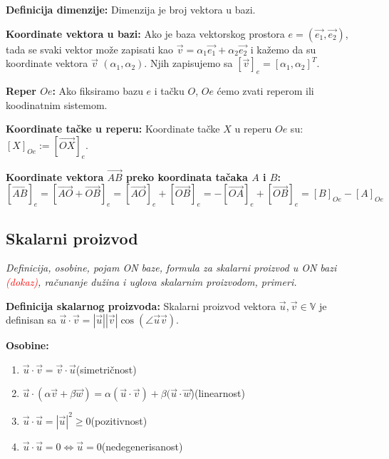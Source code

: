 \documentclass[12pt]{article}
\newcommand{\vek}[1]{\overrightarrow{#1}}
\newcommand{\ocena}[1]{\textcolor{red}{#1}}
\begin{document}
\textbf{Definicija dimenzije:} Dimenzija je broj vektora u bazi.
\par

\textbf{Koordinate vektora u bazi:} Ako je baza vektorskog prostora
$e=(\vek{e_1}, \vek{e_2})$, tada se svaki vektor može zapisati kao
$\vek{v}=\alpha_1\vek{e_1}+\alpha_2\vek{e_2}$ i kažemo da su koordinate
vektora $\vek{v}$ $(\alpha_1, \alpha_2)$. Njih zapisujemo sa
$[\vek{v}]_e=[\alpha_1, \alpha_2]^T$.
\par

\textbf{Reper $Oe$:} Ako fiksiramo bazu $e$ i tačku $O$, $Oe$ ćemo zvati reperom
ili koodinatnim sistemom.
\par

\textbf{Koordinate tačke u reperu:} Koordinate tačke $X$ u reperu $Oe$ su:
$[X]_{Oe}:=[\vek{OX}]_e$.
\par

\textbf{Koordinate vektora $\vek{AB}$ preko koordinata tačaka $A$ i $B$:}
$$[\vek{AB}]_e=[\vek{AO}+\vek{OB}]_e=[\vek{AO}]_e+[\vek{OB}]_e=
    -[\vek{OA}]_e+[\vek{OB}]_e=[B]_{Oe}-[A]_{Oe}$$


\subsection{Skalarni proizvod}
\textit{Definicija, osobine, pojam ON baze, formula za skalarni proizvod u ON
    bazi \ocena{(dokaz)}, računanje dužina i uglova skalarnim proizvodom, primeri.}
\par
\vspace*{1cm}

\textbf{Definicija skalarnog proizvoda:} Skalarni proizvod vektora
$\vek{u},\vek{v}\in\mathbb{V}$ je definisan sa $\vek{u}\cdot\vek{v}=|\vek{u}|
    |\vek{v}|\cos(\angle{\vek{u}\vek{v}})$.
\par

\textbf{Osobine:}
\begin{enumerate}[label=\textbf{(\arabic*)}]
    \item $\vek{u}\cdot\vek{v}=\vek{v}\cdot\vek{u}$\hspace*{1cm}(simetričnost)
    \item $\vek{u}\cdot(\alpha\vek{v}+\beta\vek{w})=\alpha(\vek{u}\cdot\vek{v})
          +\beta(\vek{u}\cdot\vek{w}$)\hspace*{1cm}(linearnost)
    \item $\vek{u}\cdot\vek{u}=|\vek{u}|^2\geq0$\hspace*{1cm}(pozitivnost)
    \item $\vek{u}\cdot\vek{u}=0\iff\vek{u}=0$\hspace*{1cm}(nedegenerisanost)
\end{enumerate}
\par
\end{document}
